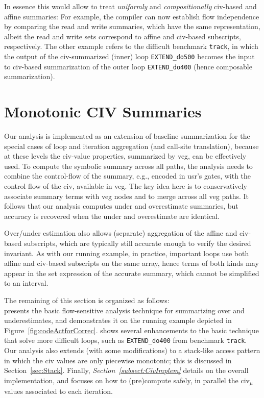 \documentclass[10pt,nocopyrightspace]{sigplanconf}
\begin{document}
\enlargethispage{\baselineskip}

In essence this would allow to treat {\em uniformly} and {\em compositionally} 
{\sc civ}-based and affine summaries: For example, the compiler can now 
establish flow independence by comparing the read and write summaries, 
which have the same representation, albeit the read and write sets
correspond to affine and {\sc civ}-based subscripts, respectively.
The other example refers to the difficult benchmark
{\tt track}, in which the output of the {\sc civ}-summarized (inner) loop 
{\tt EXTEND\_do500} becomes the input to {\sc civ}-based summarization 
of the outer loop {\tt EXTEND\_do400} (hence composable summarization).


\section{Monotonic CIV Summaries}
\label{sec:MonotonicCiv}

Our analysis is implemented as an extension of baseline 
summarization for the special cases of loop and iteration 
aggregation (and call-site translation), because at these 
levels the {\sc civ}-value properties, summarized by 
{\sc veg}, can be effectively used.
%
To compute the symbolic summary across all paths, the analysis
needs to combine the control-flow of the summary, e.g., 
encoded in {\sc usr}'s gates, with the control flow of the 
{\sc civ}, available in {\sc veg}. 
The key idea here is to conservatively 
associate summary terms with {\sc veg} nodes
and to merge across all {\sc veg} paths.
It follows that our analysis computes under and overestimate
summaries, but accuracy is recovered when the under and 
overestimate are identical.

Over/under estimation also allows (separate) aggregation of the 
affine and {\sc civ}-based subscripts, which are typically
still accurate enough to verify the desired invariant.
%
As with our running example, in practice, important loops use both
affine and {\sc civ}-based subscripts on the same array, hence 
terms of both kinds may appear in the set expression
of the accurate summary, which cannot be simplified
to an interval.

The remaining of this section is organized as follows:\\
%
 presents the basic flow-sensitive 
analysis technique for summarizing over and underestimates, and 
demonstrates it on the running example depicted in 
Figure~\ref{fig:codeActforCorrec}.
%
 shows several enhancements
to the basic technique that solve  
more difficult loops, such as {\tt EXTEND\_do400} from benchmark {\tt track}.
%
Our analysis also extends (with some modifications) to a stack-like access 
pattern in which the {\sc civ} values are only piecewise monotonic;
this is discussed in Section~\ref{sec:Stack}. 
%
Finally, {\em Section~\ref{subsect:CivImplem}} details on the overall 
implementation, and focuses on how to (pre)compute safely, in parallel 
the {\sc civ}$_\mu$ values associated to each iteration.
\end{document}
